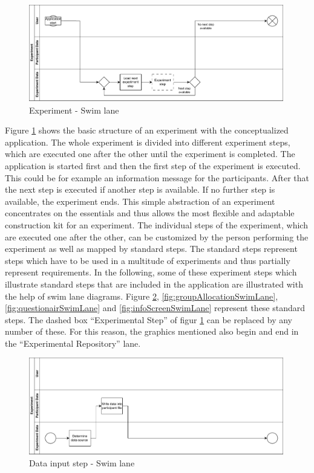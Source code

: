 \begin{figure}[htbp]
    \centering
    \includegraphics[width=0.99\textwidth, keepaspectratio]{content/05_design_and_dev_artefacts/ExperimentSwimLane.drawio.pdf}
    \caption{Experiment - Swim lane}    
    \label{fig:experimentSwimLane}
\end{figure}

Figure \ref{fig:experimentSwimLane} shows the basic structure of an experiment with the conceptualized application. The whole experiment is divided into different experiment steps, which are executed one after the other until the experiment is completed. The application is started first and then the first step of the experiment is executed. This could be for example an information message for the participants. After that the next step is executed if another step is available. If no further step is available, the experiment ends. This simple abstraction of an experiment concentrates on the essentials and thus allows the most flexible and adaptable construction kit for an experiment. The individual steps of the experiment, which are executed one after the other, can be customized by the person performing the experiment as well as mapped by standard steps. The standard steps represent steps which have to be used in a multitude of experiments and thus partially represent requirements. In the following, some of these experiment steps which illustrate standard steps that are included in the application are illustrated with the help of swim lane diagrams. Figure \ref{fig:DataInputSwimLane}, \ref{fig:groupAllocationSwimLane}, \ref{fig:questionairSwimLane} and \ref{fig:infoScreenSwimLane} represent these standard steps. The dashed box \enquote{Experimental Step} of figur \ref{fig:experimentSwimLane} can be replaced by any number of these. For this reason, the graphics mentioned also begin and end in the \enquote{Experimental Repository} lane.

\begin{figure}[htbp]
    \centering
    \includegraphics[width=0.99\textwidth, keepaspectratio]{content/05_design_and_dev_artefacts/DataInputSwimLane.drawio.pdf}
    \caption{Data input step - Swim lane}    
    \label{fig:DataInputSwimLane}
\end{figure}

